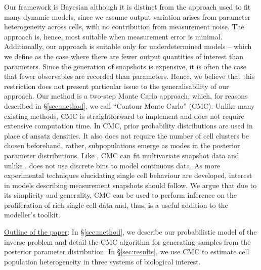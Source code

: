 Our framework is Bayesian although it is distinct from the approach used to fit many dynamic models, since we assume output variation arises from parameter heterogeneity across cells, with no contribution from measurement noise. The approach is, hence, most suitable when measurement error is minimal. Additionally, our approach is suitable only for underdetermined models -- which we define as the case where there are fewer output quantities of interest than parameters. Since the generation of snapshots is expensive, it is often the case that fewer observables are recorded than parameters. Hence, we believe that this restriction does not present particular issue to the generalisability of our approach. Our method is a two-step Monte Carlo approach, which, for reasons described in \S \ref{sec:method}, we call ``Contour Monte Carlo'' (CMC). Unlike many existing methods, CMC is straightforward to implement and does not require extensive computation time. In CMC, prior probability distributions are used in place of ansatz densities. It also does not require the number of cell clusters be chosen beforehand, rather, subpopulations emerge as modes in the posterior parameter distributions. Like \cite{loos2018hierarchical}, CMC can fit multivariate snapshot data and unlike \cite{dixit2018maximum}, does not use discrete bins to model continuous data. As more experimental techniques elucidating single cell behaviour are developed, interest in models describing measurement snapshots should follow. We argue that due to its simplicity and generality, CMC can be used to perform inference on the proliferation of rich single cell data and, thus, is a useful addition to the modeller's toolkit.


\underline{Outline of the paper}: In \S \ref{sec:method}, we describe our probabilistic model of the inverse problem and detail the CMC algorithm for generating samples from the posterior parameter distribution. In \S \ref{sec:results}, we use CMC to estimate cell population heterogeneity in three systems of biological interest.


